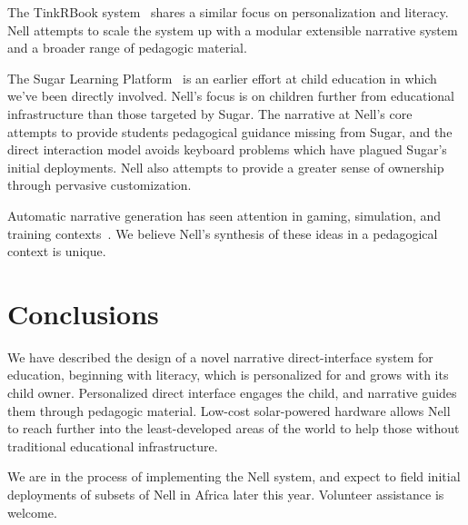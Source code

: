 \documentclass[preprint]{sig-alternate}
\begin{document}
The TinkRBook system~\cite{chang:tinkrbook} shares a similar focus on
personalization and literacy.  Nell attempts to scale the system up
with a modular extensible narrative system and a broader range
of pedagogic material.

The Sugar Learning Platform~\cite{sugar} is an earlier effort at
child education in which we've been directly involved.  Nell's focus is
on children further from educational infrastructure than those
targeted by Sugar.
The narrative at Nell's core attempts to provide students
pedagogical guidance missing from Sugar,
and the direct interaction model avoids keyboard
problems which have plagued Sugar's initial deployments.  Nell also
attempts to provide a greater sense of ownership through pervasive
customization.



Automatic narrative generation has seen attention in
gaming, simulation, and training contexts~\cite{riedl:2008}.
We believe
Nell's synthesis of these ideas in a pedagogical context is unique.

\section{Conclusions}
We have described the design of a novel narrative direct-interface
system for education, beginning with literacy, which is personalized for and grows with
its child owner.  Personalized direct interface engages the child, and
narrative guides them through pedagogic material.  Low-cost
solar-powered hardware allows Nell to reach further into the
least-developed areas of the world to help those without traditional
educational infrastructure.

We are in the process of implementing the Nell system, and expect to
field initial deployments of subsets of Nell in Africa later this year.
Volunteer assistance is welcome.

\end{document}
